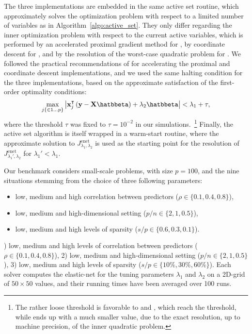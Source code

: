 The three implementations are embedded in the same active set routine, which
approximately solves the optimization problem with respect to a limited number
of variables as in Algorithm~\ref{algo:active_set}.
They only differ regarding the inner optimization problem with respect to the
current active variables, which is performed by an
accelerated proximal gradient method for , by coordinate descent
for  , and by the resolution of the worst-case quadratic
problem for .
We followed the practical recommendations of \citet{2012_FML_Bach} for
accelerating the proximal and coordinate descent implementations, and we used
the same halting condition for the three implementations, based on the
approximate satisfaction of the first-order optimality conditions:
\begin{equation}
  \label{eq:tau_conv}
  \max_{j\{\in 1\dots p\}} \left| \mathbf{x}_j^\intercal\left(\mathbf{y}
      -\mathbf{X}\hatbbeta                 
    \right) + \lambda_2\hatbbeta \right| <
  \lambda_1 + \tau,
\end{equation}
where the threshold $\tau$ was fixed to $\tau=10^{-2}$ in our simulations.~\footnote{%
  The rather loose threshold is favorable to  and
  , which reach the threshold, while 
  ends up with a much smaller value, due to the exact resolution, up to
  machine precision, of the inner quadratic problem.
}
Finally, the active set algorithm is itself wrapped in a warm-start routine,
where the approximate solution to $J^{\text{enet}}_{\lambda_1,\lambda_2}$ is
used as the starting point for the resolution of
$J^{\text{enet}}_{\lambda_1',\lambda_2}$ for $\lambda_1' < \lambda_1$.

Our benchmark considers small-scale problems, with size $p=100$, and the nine
situations stemming from the choice of three following parameters:
\iflong
\begin{itemize}
\item low,  medium  and  high correlation between predictors ($\rho \in \{0.1, 0.4, 0.8\}$),
\item low, medium and  high-dimensional setting ($p/n \in \{2, 1,
  0.5\}$),
\item low, medium and high levels of sparsity ($s/p\in\{0.6 ,0.3,0.1\}$).
\end{itemize}
) low,  medium  and  high levels of correlation between predictors ($\rho \in \{0.1, 0.4, 0.8\}$),
2) low, medium and  high-dimensional setting ($p/n \in \{2, 1, 0.5\}$),
3) low, medium and high levels of sparsity ($s/p\in\{10\% ,30\%,60\%\}$).
\fi
Each solver computes the elastic-net for the tuning parameters $\lambda_1$ and
$\lambda_2$ on a 2D-grid of $50 \times 50$ values, and their running 
times have been averaged over 100 runs.

